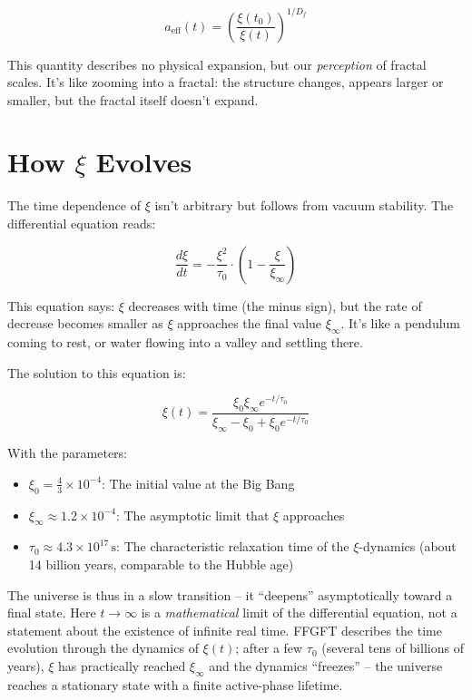 \begin{equation}
a_{\text{eff}}(t) = \left(\frac{\xi(t_0)}{\xi(t)}\right)^{1/D_f}
\end{equation}

This quantity describes no physical expansion, but our \textit{perception} of fractal scales. It's like zooming into a fractal: the structure changes, appears larger or smaller, but the fractal itself doesn't expand.

\section{How $\xi$ Evolves}

The time dependence of $\xi$ isn't arbitrary but follows from vacuum stability. The differential equation reads:

\begin{equation}
\frac{d\xi}{dt} = -\frac{\xi^2}{\tau_0} \cdot \left(1 - \frac{\xi}{\xi_{\infty}}\right)
\end{equation}

This equation says: $\xi$ decreases with time (the minus sign), but the rate of decrease becomes smaller as $\xi$ approaches the final value $\xi_{\infty}$. It's like a pendulum coming to rest, or water flowing into a valley and settling there.

The solution to this equation is:

\begin{equation}
\xi(t) = \frac{\xi_0 \xi_{\infty} e^{-t/\tau_0}}{\xi_{\infty} - \xi_0 + \xi_0 e^{-t/\tau_0}}
\end{equation}

With the parameters:
\begin{itemize}[leftmargin=*]
\item $\xi_0 = \frac{4}{3} \times 10^{-4}$: The initial value at the Big Bang
\item $\xi_{\infty} \approx 1.2 \times 10^{-4}$: The asymptotic limit that $\xi$ approaches
\item $\tau_0 \approx 4.3 \times 10^{17} \, \text{s}$: The characteristic relaxation time of the $\xi$-dynamics (about 14 billion years, comparable to the Hubble age)
\end{itemize}

The universe is thus in a slow transition -- it ``deepens'' asymptotically toward a final state. Here $t \to \infty$ is a \textit{mathematical} limit of the differential equation, not a statement about the existence of infinite real time. FFGFT describes the time evolution through the dynamics of $\xi(t)$; after a few $\tau_0$ (several tens of billions of years), $\xi$ has practically reached $\xi_\infty$ and the dynamics ``freezes'' -- the universe reaches a stationary state with a finite active-phase lifetime.

